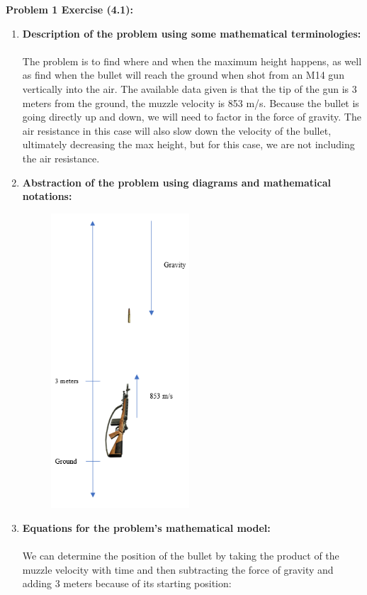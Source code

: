 \documentclass[11pt]{article}
\newcommand{\skipline}{\vspace{\baselineskip}}
\newenvironment{problem}[1]{\textbf{Problem #1: }}{\newpage}
\begin{document}
\begin{problem}{1 Exercise (4.1)}
		\skipline
		\begin{enumerate}[label = \textbf{Step \arabic*.}]
			\item \textbf{Description of the problem using some mathematical terminologies:} 
			\\ \\
			The problem is to find where and when the maximum height happens, as well as find when the bullet will reach the ground when shot from an M14 gun vertically into the air.  The available data given is that the tip of the gun is 3 meters from the ground, the muzzle velocity is 853 m/s.  Because the bullet is going directly up and down, we will need to factor in the force of gravity.  The air resistance in this case will also slow down the velocity of the bullet, ultimately decreasing the max height, but for this case, we are not including the air resistance. 
			\item \textbf{Abstraction of the problem using diagrams and mathematical notations:}
			\begin{figure}[h!]
				\centering
				\includegraphics[height = 11cm]{Photos/Prob1Diagram.png}
			\end{figure}
			\newpage
			\item \textbf{Equations for the problem’s mathematical model:}
			\\ \\
			We can determine the position of the bullet by taking the product of the muzzle velocity with time and then subtracting the force of gravity and adding 3 meters because of its starting position:

\end{enumerate}
\end{problem}
\end{document}
